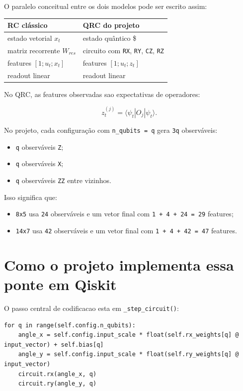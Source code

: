 \documentclass[12pt]{article}
\providecommand{\tightlist}{%
              \setlength{\itemsep}{0pt}\setlength{\parskip}{0pt}}
\begin{document}
O paralelo conceitual entre os dois modelos pode ser escrito assim:

\begin{longtable}[]{@{}ll@{}}
\toprule\noalign{}
RC clássico & QRC do projeto \\
\midrule\noalign{}
\endhead
\bottomrule\noalign{}
\endlastfoot
estado vetorial \(x_t\) & estado quântico \$ \\
matriz recorrente \(W_{res}\) & circuito com \texttt{RX}, \texttt{RY}, \texttt{CZ}, \texttt{RZ} \\
features \([1; u_t; x_t]\) & features \([1; u_t; z_t]\) \\
readout linear & readout linear \\
\end{longtable}

No QRC, as features observadas sao expectativas de operadores:

\[
z_t^{(j)} = \langle \psi_t | O_j | \psi_t \rangle.
\]

No projeto, cada configuração com \texttt{n\_qubits\ =\ q} gera \texttt{3q} observáveis:

\begin{itemize}
\tightlist
\item
  \texttt{q} observáveis \texttt{Z};
\item
  \texttt{q} observáveis \texttt{X};
\item
  \texttt{q} observáveis \texttt{ZZ} entre vizinhos.
\end{itemize}

Isso significa que:

\begin{itemize}
\tightlist
\item
  \texttt{8x5} usa \texttt{24} observáveis e um vetor final com \texttt{1\ +\ 4\ +\ 24\ =\ 29} features;
\item
  \texttt{14x7} usa \texttt{42} observáveis e um vetor final com \texttt{1\ +\ 4\ +\ 42\ =\ 47} features.
\end{itemize}

\section{Como o projeto implementa essa ponte em Qiskit}\label{5-como-o-projeto-implementa-essa-ponte-em-qiskit}

O passo central de codificacao esta em \texttt{\_step\_circuit()}:

\begin{verbatim}
for q in range(self.config.n_qubits):
    angle_x = self.config.input_scale * float(self.rx_weights[q] @ input_vector) + self.bias[q]
    angle_y = self.config.input_scale * float(self.ry_weights[q] @ input_vector)
    circuit.rx(angle_x, q)
    circuit.ry(angle_y, q)
\end{verbatim}
\end{document}
